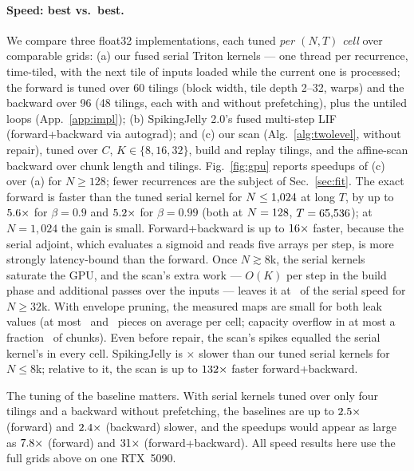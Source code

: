 \documentclass[10pt]{article}
\theoremstyle{remark}
\begin{document}
\paragraph{Speed: best vs.\ best.}
We compare three float32 implementations, each tuned \emph{per $(N,T)$ cell} over comparable grids: (a) our fused serial Triton kernels --- one thread per recurrence, time-tiled, with the next tile of inputs loaded while the current one is processed; the forward is tuned over 60 tilings (block width, tile depth 2--32, warps) and the backward over 96 (48 tilings, each with and without prefetching), plus the untiled loops (App.~\ref{app:impl}); (b) SpikingJelly 2.0's fused multi-step LIF (forward+backward via autograd); and (c) our scan (Alg.~\ref{alg:twolevel}, without repair), tuned over $C$, $K\in\{8,16,32\}$, build and replay tilings, and the affine-scan backward over chunk length and tilings. Fig.~\ref{fig:gpu} reports speedups of (c) over (a) for $N\ge128$; fewer recurrences are the subject of Sec.~\ref{sec:fit}. The exact forward is faster than the tuned serial kernel for $N\le1{,}024$ at long $T$, by up to $5.6\times$ for $\beta=0.9$ and $5.2\times$ for $\beta=0.99$ (both at $N=128$, $T=65{,}536$); at $N=1{,}024$ the gain is small. Forward+backward is up to $16\times$ faster, because the serial adjoint, which evaluates a sigmoid and reads five arrays per step, is more strongly latency-bound than the forward. Once $N\gtrsim 8$k, the serial kernels saturate the GPU, and the scan's extra work --- $O(K)$ per step in the build phase and additional passes over the inputs --- leaves it at \BigNFbNine\ of the serial speed for $N\ge32$k. With envelope pruning, the measured maps are small for both leak values (at most \MaxPiecesNine\ and \MaxPiecesNineNine\ pieces on average per cell; capacity overflow in at most a fraction \MaxOvfNineNine\ of chunks). Even before repair, the scan's spikes equalled the serial kernel's in every cell. SpikingJelly is \SJvsSerialSmall$\times$ slower than our tuned serial kernels for $N\le8$k; relative to it, the scan is up to $132\times$ faster forward+backward.

The tuning of the baseline matters. With serial kernels tuned over only four tilings and a backward without prefetching, the baselines are up to $2.5\times$ (forward) and $2.4\times$ (backward) slower, and the speedups would appear as large as $7.8\times$ (forward) and $31\times$ (forward+backward). All speed results here use the full grids above on one RTX~5090.
\end{document}
